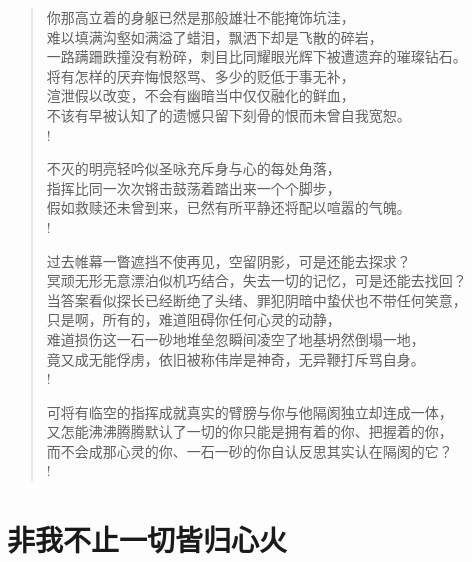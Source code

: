 \documentclass[UTF8, 12pt, a4paper]{ctexrep} %
\begin{document}
\begin{verse}
你那高立着的身躯已然是那般雄壮不能掩饰坑洼，\\
难以填满沟壑如满溢了蜡泪，飘洒下却是飞散的碎岩，\\
一路蹒跚跌撞没有粉碎，刺目比同耀眼光辉下被遭遗弃的璀璨钻石。\\
将有怎样的厌弃悔恨怒骂、多少的贬低于事无补，\\
渲泄假以改变，不会有幽暗当中仅仅融化的鲜血，\\
不该有早被认知了的遗憾只留下刻骨的恨而未曾自我宽恕。\\!

不灭的明亮轻吟似圣咏充斥身与心的每处角落，\\
指挥比同一次次锵击鼓荡着踏出来一个个脚步，\\
假如救赎还未曾到来，已然有所平静还将配以喧嚣的气魄。\\!

过去帷幕一瞥遮挡不使再见，空留阴影，可是还能去探求？\\
冥顽无形无意漂泊似机巧结合，失去一切的记忆，可是还能去找回？\\
当答案看似探长已经断绝了头绪、罪犯阴暗中蛰伏也不带任何笑意，\\
只是啊，所有的，难道阻碍你任何心灵的动静，\\
难道损伤这一石一砂地堆垒忽瞬间凌空了地基坍然倒塌一地，\\
竟又成无能俘虏，依旧被称伟岸是神奇，无异鞭打斥骂自身。\\!

可将有临空的指挥成就真实的臂膀与你与他隔阂独立却连成一体，\\
又怎能沸沸腾腾默认了一切的你只能是拥有着的你、把握着的你，\\
而不会成那心灵的你、一石一砂的你自认反思其实认在隔阂的它？\\!

\end{verse}

\section{非我不止一切皆归心火}
\newpage
\end{document}
